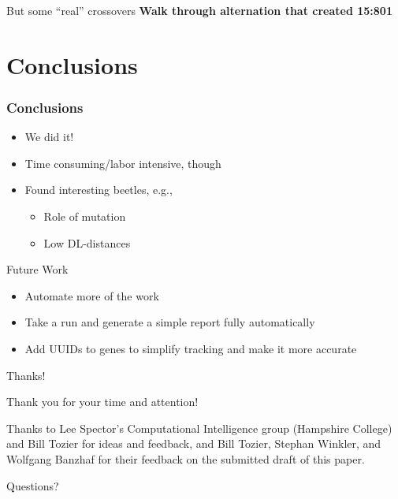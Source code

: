 \documentclass{beamer}
\newcommand{\linespace}{\vskip 0.25cm}
\begin{document}
\begin{frame}{But some ``real'' crossovers}
	\textbf{Walk through alternation that created 15:801}
\end{frame}

\section[Conclusions]{Conclusions}

\begin{frame}
\frametitle{Conclusions}

\begin{itemize}
\item We did it!
\item Time consuming/labor intensive, though
\item Found interesting beetles, e.g.,
\begin{itemize}
	\item Role of mutation
	\item Low DL-distances
\end{itemize}
\end{itemize}

\linespace
\linespace

Future Work
\begin{itemize}
\item Automate more of the work
\item Take a run and generate a simple report fully automatically
\item Add UUIDs to genes to simplify tracking and make it more accurate
\end{itemize}
\end{frame}

\begin{frame}{Thanks!}
	
	Thank you for your time and attention!

	\linespace
	
	Thanks to Lee Spector's Computational Intelligence group (Hampshire College) and Bill Tozier for ideas and feedback, and Bill Tozier, Stephan Winkler, and Wolfgang Banzhaf for their feedback on the submitted draft of this paper.
		
	\linespace
	\linespace
	
	\begin{center}
	{\huge Questions?}
	\end{center}
\end{frame}

%
%
\end{document}
